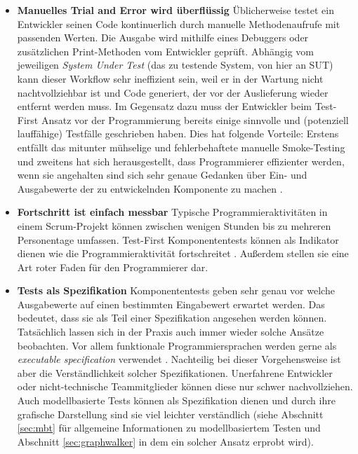 \begin{itemize}
\item \textbf{Manuelles Trial and Error wird überflüssig} Üblicherweise testet ein Entwickler seinen Code kontinuerlich durch manuelle Methodenaufrufe mit passenden Werten. Die Ausgabe wird mithilfe eines Debuggers oder zusätzlichen Print-Methoden vom Entwickler geprüft. Abhängig vom jeweiligen \textit{System Under Test} (das zu testende System, von hier an \gls{SUT}) kann dieser Workflow sehr ineffizient sein, weil er in der Wartung nicht nachtvollziehbar ist und Code generiert, der vor der Auslieferung wieder entfernt werden muss. Im Gegensatz dazu muss der Entwickler beim Test-First Ansatz vor der Programmierung bereits einige sinnvolle und (potenziell lauffähige) Testfälle geschrieben haben. Dies hat folgende Vorteile: Erstens entfällt das mitunter mühselige und fehlerbehaftete manuelle \Gls{Smoke-Testing} und zweitens hat sich herausgestellt, dass Programmierer effizienter werden, wenn sie angehalten sind sich sehr genaue Gedanken über Ein- und Ausgabewerte der zu entwickelnden Komponente zu machen \cite{erdogmus_effectiveness_2005}.
\item \textbf{Fortschritt ist einfach messbar} Typische Programmieraktivitäten in einem Scrum-Projekt können zwischen wenigen Stunden bis zu mehreren Personentage umfassen. Test-First Komponententests können als Indikator dienen wie die Programmieraktivität fortschreitet \cite{linz_testing_2014}. Außerdem stellen sie eine Art roter Faden für den Programmierer dar.
\item \textbf{Tests als Spezifikation} Komponententests geben sehr genau vor welche Ausgabewerte auf einen bestimmten Eingabewert erwartet werden. Das bedeutet, dass sie als Teil einer Spezifikation angesehen werden können. Tatsächlich lassen sich in der Praxis auch immer wieder solche Ansätze beobachten. Vor allem funktionale Programmiersprachen werden gerne als \textit{executable specification} verwendet \cite{klein_sel4:_2010}. Nachteilig bei dieser Vorgehensweise ist aber die Verständlichkeit solcher Spezifikationen. Unerfahrene Entwickler oder nicht-technische Teammitglieder können diese nur schwer nachvollziehen. Auch modellbasierte Tests können als Spezifikation dienen und durch ihre grafische Darstellung sind sie viel leichter verständlich (siehe Abschnitt \ref{sec:mbt} für allgemeine Informationen zu modellbasiertem Testen und Abschnitt \ref{sec:graphwalker} in dem ein solcher Ansatz erprobt wird).
\end{itemize}


